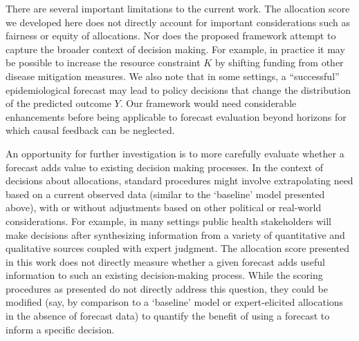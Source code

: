 \documentclass{article}\usepackage[]{graphicx}\usepackage[]{xcolor}
\begin{document}
There are several important limitations to the current work.
The allocation score we developed here does not directly account for important considerations such as fairness or equity of allocations.
Nor does the proposed framework attempt to capture the broader context of decision making. For example, in practice it may be possible to increase the resource constraint $K$ by shifting funding from other disease mitigation measures.
We also note that in some settings, a ``successful'' epidemiological forecast may lead to policy decisions that change the distribution of the predicted outcome $Y$. Our framework would need considerable enhancements before being applicable to forecast evaluation beyond horizons
for which causal feedback can be neglected. 

An opportunity for further investigation is to more carefully evaluate whether a forecast adds value to existing decision making processes.
In the context of decisions about allocations, standard procedures might involve extrapolating need based on a current observed data (similar to the `baseline' model presented above), with or without adjustments based on other political or real-world considerations.
For example, in many settings public health stakeholders will make decisions after synthesizing information from a variety of quantitative and qualitative sources coupled with expert judgment.
The allocation score presented in this work does not directly measure whether a given forecast adds useful information to such an existing decision-making process.
While the scoring procedures as presented do not directly address this question, they could be modified (say, by comparison to a `baseline' model or expert-elicited allocations in the absence of forecast data) to quantify the benefit of using a forecast to inform a specific decision.

\end{document}
